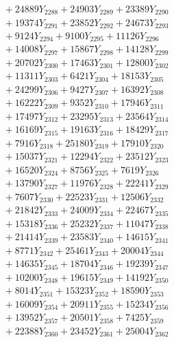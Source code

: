 \documentclass[a4paper,10pt]{article}
\begin{document}
{\begin{align}
&\;  + 24889 Y_{2288} + 24903 Y_{2289} + 23389 Y_{2290} \\[0.3ex]
&\;  + 19374 Y_{2291} + 23852 Y_{2292} + 24673 Y_{2293} \\[0.3ex]
&\;  + 9124 Y_{2294} + 9100 Y_{2295} + 11126 Y_{2296} \\[0.3ex]
&\;  + 14008 Y_{2297} + 15867 Y_{2298} + 14128 Y_{2299} \\[0.3ex]
&\;  + 20702 Y_{2300} + 17463 Y_{2301} + 12800 Y_{2302} \\[0.3ex]
&\;  + 11311 Y_{2303} + 6421 Y_{2304} + 18153 Y_{2305} \\[0.3ex]
&\;  + 24299 Y_{2306} + 9427 Y_{2307} + 16392 Y_{2308} \\[0.5ex]\allowbreak
&\;  + 16222 Y_{2309} + 9352 Y_{2310} + 17946 Y_{2311} \\[0.3ex]
&\;  + 17497 Y_{2312} + 23295 Y_{2313} + 23564 Y_{2314} \\[0.3ex]
&\;  + 16169 Y_{2315} + 19163 Y_{2316} + 18429 Y_{2317} \\[0.3ex]
&\;  + 7916 Y_{2318} + 25180 Y_{2319} + 17910 Y_{2320} \\[0.3ex]
&\;  + 15037 Y_{2321} + 12294 Y_{2322} + 23512 Y_{2323} \\[0.3ex]
&\;  + 16520 Y_{2324} + 8756 Y_{2325} + 7619 Y_{2326} \\[0.3ex]
&\;  + 13790 Y_{2327} + 11976 Y_{2328} + 22241 Y_{2329} \\[0.3ex]
&\;  + 7607 Y_{2330} + 22523 Y_{2331} + 12506 Y_{2332} \\[0.3ex]
&\;  + 21842 Y_{2333} + 24009 Y_{2334} + 22467 Y_{2335} \\[0.3ex]
&\;  + 15318 Y_{2336} + 25232 Y_{2337} + 11047 Y_{2338} \\[0.5ex]\allowbreak
&\;  + 21414 Y_{2339} + 23583 Y_{2340} + 14615 Y_{2341} \\[0.3ex]
&\;  + 8771 Y_{2342} + 25461 Y_{2343} + 20004 Y_{2344} \\[0.3ex]
&\;  + 14635 Y_{2345} + 18704 Y_{2346} + 19239 Y_{2347} \\[0.3ex]
&\;  + 10200 Y_{2348} + 19615 Y_{2349} + 14192 Y_{2350} \\[0.3ex]
&\;  + 8014 Y_{2351} + 15323 Y_{2352} + 18590 Y_{2353} \\[0.3ex]
&\;  + 16009 Y_{2354} + 20911 Y_{2355} + 15234 Y_{2356} \\[0.3ex]
&\;  + 13952 Y_{2357} + 20501 Y_{2358} + 7425 Y_{2359} \\[0.3ex]
&\;  + 22388 Y_{2360} + 23452 Y_{2361} + 25004 Y_{2362} \\[0.3ex]

\end{align}}
\end{document}
